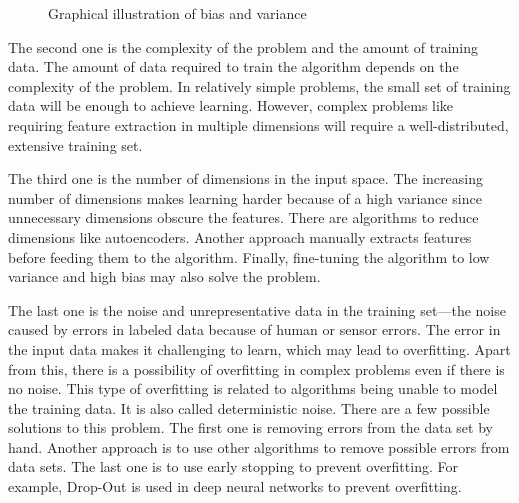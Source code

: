 \begin{figure}[htbp]
\centering
{}
\caption{Graphical illustration of bias and variance \cite{biasandvarianceillustration}}
\label{fig:BiasAndVariance}
\end{figure}

The second one is the complexity of the problem and the amount of training data. The amount of data required to train the algorithm depends on the complexity of the problem. In relatively simple problems, the small set of training data will be enough to achieve learning. However, complex problems like requiring feature extraction in multiple dimensions will require a well-distributed, extensive training set.

The third one is the number of dimensions in the input space. The increasing number of dimensions makes learning harder because of a high variance since unnecessary dimensions obscure the features. There are algorithms to reduce dimensions like autoencoders. Another approach manually extracts features before feeding them to the algorithm. Finally, fine-tuning the algorithm to low variance and high bias may also solve the problem.

The last one is the noise and unrepresentative data in the training set—the noise caused by errors in labeled data because of human or sensor errors. The error in the input data makes it challenging to learn, which may lead to overfitting. Apart from this, there is a possibility of overfitting in complex problems even if there is no noise. This type of overfitting is related to algorithms being unable to model the training data. It is also called deterministic noise. There are a few possible solutions to this problem. The first one is removing errors from the data set by hand. Another approach is to use other algorithms to remove possible errors from data sets. The last one is to use early stopping to prevent overfitting. For example, Drop-Out is used in deep neural networks to prevent overfitting.

